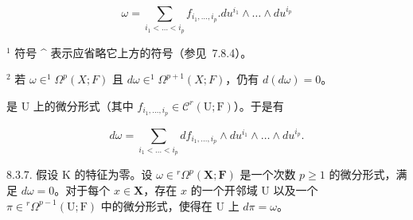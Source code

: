 \[
\omega = \sum_ {i _ {1} <   \dots <   i _ {p}} f _ {i _ {1}, \dots , i _ {p}}. d u ^ {i _ {1}} \wedge \dots \wedge d u ^ {i _ {p}}
\]

\(^{1}\) 符号 \^{} 表示应省略它上方的符号（参见~7.8.4）。

\(^{2}\) 若 \(\omega\in^{1}\Omega^{p}(X;F)\) 且 \(d\omega\in^{1}\Omega^{p+1}(X;F)\)，仍有 \(d(d\omega)=0\)。

是 U 上的微分形式（其中 \(f_{i_1,\ldots,i_p} \in \mathcal{C}^r(\mathrm{U};\mathrm{F})\)）。于是有

\[
d \omega = \sum_ {i _ {1} <   \dots <   i _ {p}} d f _ {i _ {1}, \dots , i _ {p}} \wedge d u ^ {i _ {1}} \wedge \dots \wedge d u ^ {i _ {p}}.\tag{11}
\]

8.3.7. 假设 K 的特征为零。设 \(\omega \in {}^r\Omega^p (\mathbf{X};\mathbf{F})\) 是一个次数 \(p\geqslant 1\) 的微分形式，满足 \(d\omega = 0\)。对于每个 \(x\in \mathbf{X}\)，存在 \(x\) 的一个开邻域 U 以及一个 \(\pi \in {}^r\Omega^{p - 1}(\mathrm{U};\mathrm{F})\) 中的微分形式，使得在 U 上 \(d\pi = \omega\)。

